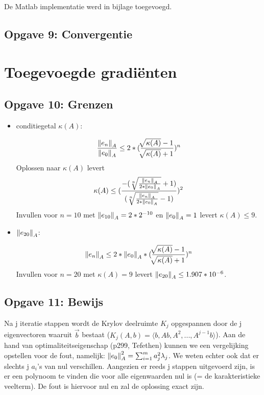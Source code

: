 \documentclass[a4paper]{article}
\newcommand{\opgave}[1]{\subsection{Opgave #1}}
\begin{document}
De Matlab implementatie werd in bijlage toegevoegd.

\opgave{9: Convergentie}\label{sec:oef9}

\section{Toegevoegde gradi\"enten}\label{sec:CG}

\opgave{10: Grenzen}\label{sec:oef10}

\begin{itemize}
    	\item conditiegetal \(\kappa(A)\): \par\noindent
        \[\frac{\norm{e_n}_A}{\norm{e_0}_A} \leq 2*(\frac{\sqrt[]{\kappa(A)}-1}{\sqrt[]					{\kappa(A)}+1})^n\]
        Oplossen naar \(\kappa(A)\) levert
        \[\kappa(A) \leq (\frac{-(\sqrt[n]{\frac{\norm{e_n}_A}{2*\norm{e_0}_A}}+1)}						{(\sqrt[n]{\frac{\norm{e_n}_A}{2*\norm{e_0}_A}}-1)})^2\]
        Invullen voor \(n = 10\) met \(\norm{e_{10}}_A = 2*2^{-10}\) en \(\norm{e_0}_A = 1\) 			levert \(\kappa(A) \leq 9\).
        
        \item \(\norm{e_{20}}_A\): \par\noindent
        \[\norm{e_n}_A \leq 2*\norm{e_0}_A*(\frac{\sqrt[]{\kappa(A)}-1}{\sqrt[]							{\kappa(A)}+1})^n\]
        Invullen voor \(n = 20\) met \(\kappa(A) = 9\) levert \(\norm{e_{20}}_A \leq 					1.907*10^{-6}\).
	\end{itemize}

\opgave{11: Bewijs}\label{sec:oef11}
Na j iteratie stappen wordt de Krylov deelruimte $K_j$ opgespannen door de j eigenvectoren waaruit $\vec{b}$ bestaat ($K_j(A,b) = \langle b, Ab, A^2,... ,A^{j-1}b \rangle $). Aan de hand van optimaliteitseigenschap (p299, Tefethen) kunnen we een vergelijking opstellen voor de fout, namelijk: $\norm{e_0}_A^2 = \sum_{i=1}^m a_j^2 \lambda_j$. We weten echter ook dat er slechts j $a_i$'s van nul verschillen. Aangezien er reeds j stappen uitgevoerd zijn, is er een polynoom te vinden die voor alle eigenwaarden nul is (= de karakteristieke veelterm). De fout is hiervoor nul en zal de oplossing exact zijn.
\end{document}
